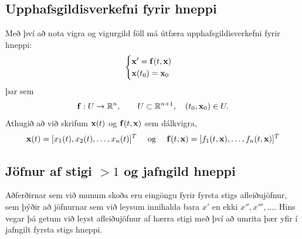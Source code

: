 \documentclass[letterpaper,10pt,icelandic]{sphinxmanual}
\begin{document}
\subsection{Upphafsgildisverkefni fyrir hneppi}
\label{kafli06:upphafsgildisverkefni-fyrir-hneppi}
Með því að nota vigra og vigurgild föll má útfæra upphafsgildisverkefni fyrir hneppi:
\begin{gather}
\begin{split}\begin{cases}
{\mbox{${\bf x}$}}' ={\mbox{${\bf f}$}}(t,{\mbox{${\bf x}$}})\\
{\mbox{${\bf x}$}}(t_0) = {\mbox{${\bf x}$}}_0
\end{cases}\end{split}\notag
\end{gather}
þar sem
\begin{gather}
\begin{split}{\mbox{${\bf f}$}}: U \rightarrow {{\mathbb  R}}^n, \qquad U\subset \mathbb{R}^{n+1}, \quad
(t_0,{\mbox{${\bf x}$}}_0) \in U.\end{split}\notag
\end{gather}
Athugið að við skrifum \({\mbox{${\bf x}$}}(t)\) og
\({\mbox{${\bf f}$}}(t,{\mbox{${\bf x}$}})\) sem dálkvigra,
\begin{gather}
\begin{split}{\mbox{${\bf x}$}}(t) = [x_1(t), x_2(t), \ldots , x_n(t)]^T
\quad \text{  og } \quad
{\mbox{${\bf f}$}}(t,{\mbox{${\bf x}$}}) = [f_1(t,{\mbox{${\bf x}$}}), \ldots , f_n(t, {\mbox{${\bf x}$}})]^T\end{split}\notag
\end{gather}

\subsection{Jöfnur af stigi \(>1\) og jafngild hneppi}
\label{kafli06:index-3}\label{kafli06:jofnur-af-stigi-og-jafngild-hneppi}
Aðferðirnar sem við munum skoða eru eingöngu fyrir fyrsta stigs afleiðujöfnur,
sem þýðir að jöfnurnar sem við leysum
innihalda bara \(x'\) en ekki \(x'',x''',\ldots\).
Hins vegar þá getum við leyst afleiðujöfnur af hærra stigi með því að umrita þær yfir í jafngilt
fyrsta stigs hneppi.
\end{document}
